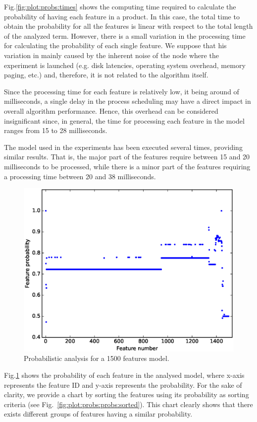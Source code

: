 Fig.\ref{fig:plot:probs:times} shows the computing time required to calculate the probability of having 
each feature in a product. In this case, the total time to obtain the probability for all the features is linear 
with respect to the total length of the analyzed term. However, there is a small variation in the processing time 
for calculating the probability of each single feature. We suppose that his variation in mainly 
caused by the inherent noise of the node where the experiment is launched (e.g. disk latencies, operating 
system overhead, memory paging, etc.) and, therefore, it is not related to the algorithm itself.

Since the processing time for each feature is relatively low, it being around of milliseconds, a single delay in 
the process scheduling may have a direct impact in overall algorithm performance. Hence, this overhead 
can be considered insignificant since, in general, the time for processing each feature in the model ranges 
from 15 to 28 milliseconds.

The model used in the experiments has been executed several times, providing similar results. That is, the 
major part of the features require between 15 and 20 milliseconds to be processed, while there is a minor 
part of the features requiring a processing time between 20 and 38 milliseconds.

\begin{figure}[h]
	\centering
	\linefigure
	\includegraphics[width=0.8\hsize,angle=0]{plot_probs_probs.eps}
	\linefigure
	\caption{Probabilistic analysis for a 1500 features model.}\label{fig:plot:probs:probs}
\end{figure}

Fig.\ref{fig:plot:probs:probs} shows the probability of each feature in the analysed model, where x-axis 
represents the feature ID and y-axis represents the probability. For the sake of clarity, we provide a chart by 
sorting the features using its probability as sorting criteria (see Fig.~\ref{fig:plot:probs:probs:sorted}). 
This chart clearly shows that there exists different groups of features having a similar probability.

